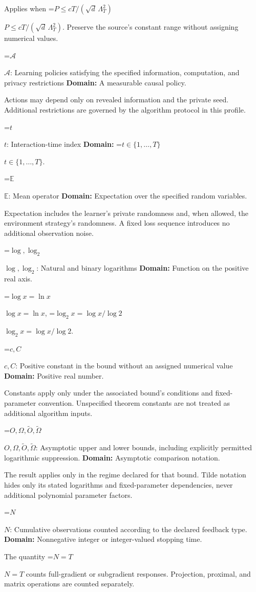 \documentclass[10pt,a4paper]{article}
\newcommand{\AtlasMath}[1]{\par\begingroup\centering\setbox0=\hbox{$\displaystyle #1$}\ifdim\wd0>1.4\linewidth\typeout{ATLAS WIDE FORMULA: \the\wd0}\fi\ifdim\wd0>\linewidth\resizebox{\linewidth}{!}{\box0}\else\box0\fi\par\endgroup}
\newcommand{\AtlasInlineMath}[1]{\begingroup\setbox0=\hbox{$#1$}\ifdim\wd0>.4\linewidth\endgroup\AtlasMath{#1}\else\endgroup$#1$\fi}
\begin{document}
Applies when \AtlasInlineMath{P\le cT/(\sqrt d\,\Lambda_T^2)}. Preserve the source's constant range without assigning numerical values.

\AtlasInlineMath{\mathcal A}: Learning policies satisfying the specified information, computation, and privacy restrictions \textbf{Domain:} A measurable causal policy.

Actions may depend only on revealed information and the private seed. Additional restrictions are governed by the algorithm protocol in this profile.

\AtlasInlineMath{t}: Interaction-time index \textbf{Domain:} \AtlasInlineMath{t\in\{1,\ldots,T\}}.

\AtlasInlineMath{\mathbb E}: Mean operator \textbf{Domain:} Expectation over the specified random variables.

Expectation includes the learner's private randomness and, when allowed, the environment strategy's randomness. A fixed loss sequence introduces no additional observation noise.

\AtlasInlineMath{\log,\log_2}: Natural and binary logarithms \textbf{Domain:} Function on the positive real axis.

\AtlasInlineMath{\log x=\ln x}, \AtlasInlineMath{\log_2x=\log x/\log2}.

\AtlasInlineMath{c,C}: Positive constant in the bound without an assigned numerical value \textbf{Domain:} Positive real number.

Constants apply only under the associated bound’s conditions and fixed-parameter convention. Unspecified theorem constants are not treated as additional algorithm inputs.

\AtlasInlineMath{O,\Omega,\widetilde O,\widetilde\Omega}: Asymptotic upper and lower bounds, including explicitly permitted logarithmic suppression. \textbf{Domain:} Asymptotic comparison notation.

The result applies only in the regime declared for that bound. Tilde notation hides only its stated logarithms and fixed-parameter dependencies, never additional polynomial parameter factors.

\AtlasInlineMath{N}: Cumulative observations counted according to the declared feedback type. \textbf{Domain:} Nonnegative integer or integer-valued stopping time.

The quantity \AtlasInlineMath{N=T} counts full-gradient or subgradient responses. Projection, proximal, and matrix operations are counted separately.
\end{document}
